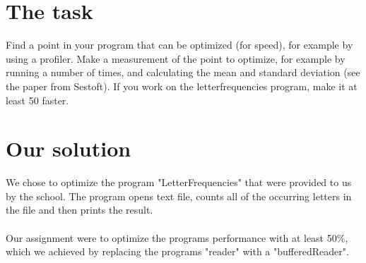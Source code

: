 \section{The task}
Find a point in your program that can be optimized (for speed), for example by using a profiler.
Make a measurement of the point to optimize, for example by running a
number of times, and calculating the mean and standard deviation (see
the paper from Sestoft).
If you work on the letterfrequencies program, make it at least 50%
faster.

\section{Our solution}
We chose to optimize the program "LetterFrequencies" that were provided to us by the school. The program opens text file, counts all of the occurring letters in the file and then prints the result.\\\\
Our assignment were to optimize the programs performance with at least 50\%, which we achieved by replacing the programs "reader" with a "bufferedReader".